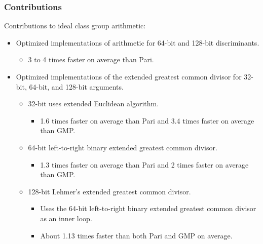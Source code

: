 \documentclass{beamer}
\begin{document}
\begin{frame}
\frametitle{Contributions}
Contributions to ideal class group arithmetic:
\begin{itemize} %
\item Optimized implementations of arithmetic for 64-bit and 128-bit discriminants.
	\begin{itemize}
	\item 3 to 4 times faster on average than Pari.
	\end{itemize}
\item Optimized implementations of the extended greatest common divisor for 32-bit, 64-bit, and 128-bit arguments.
	\begin{itemize}
	\item 32-bit uses extended Euclidean algorithm.
		\begin{itemize}
		\item 1.6 times faster on average than Pari and 3.4 times faster on average than GMP.
		\end{itemize}
	\item 64-bit left-to-right binary extended greatest common divisor.
		\begin{itemize}
		\item 1.3 times faster on average than Pari and 2 times faster on average than GMP.
		\end{itemize}
	\item 128-bit Lehmer's extended greatest common divisor.
		\begin{itemize}
		\item Uses the 64-bit left-to-right binary extended greatest common divisor as an inner loop.
		\item About 1.13 times faster than both Pari and GMP on average.
		\end{itemize}
	\end{itemize}
\end{itemize}
\end{frame}
\end{document}

